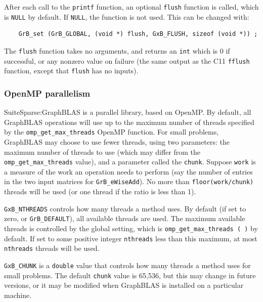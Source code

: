 After each call to the \verb'printf' function, an optional
\verb'flush' function is called, which is \verb'NULL' by default.  If
\verb'NULL', the function is not used.  This can be changed with:

{\small
\begin{verbatim}
    GrB_set (GrB_GLOBAL, (void *) flush, GxB_FLUSH, sizeof (void *)) ; \end{verbatim} }

The \verb'flush' function takes no
arguments, and returns an \verb'int' which is 0 if successful, or any nonzero
value on failure (the same output as the C11 \verb'fflush' function,
except that \verb'flush' has no inputs).

\subsubsection{OpenMP parallelism}
\label{omp_parallelism}

SuiteSparse:GraphBLAS is a parallel library, based on OpenMP.  By
default, all GraphBLAS operations will use up to the maximum number of threads
specified by the \verb'omp_get_max_threads' OpenMP function.  For small
problems, GraphBLAS may choose to use fewer threads, using two parameters: the
maximum number of threads to use (which may differ from the
\verb'omp_get_max_threads' value), and a parameter called the \verb'chunk'.
Suppose \verb'work' is a measure of the work an operation needs to perform (say
the number of entries in the two input matrices for \verb'GrB_eWiseAdd').  No
more than \verb'floor(work/chunk)' threads will be used (or one thread if the
ratio is less than 1).

\verb'GxB_NTHREADS' controls how many threads a method uses.
    By default (if set to zero, or \verb'GrB_DEFAULT'), all available threads
    are used.  The maximum available threads is controlled by the global
    setting, which is \verb'omp_get_max_threads ( )' by default.  If set to
    some positive integer \verb'nthreads' less than this maximum, at most
    \verb'nthreads' threads will be used.

\verb'GxB_CHUNK' is a \verb'double' value that controls how many threads
    a method uses for small problems.
The default \verb'chunk' value is 65,536, but this may change in future
versions, or it may be modified when GraphBLAS is installed on a particular
machine.

